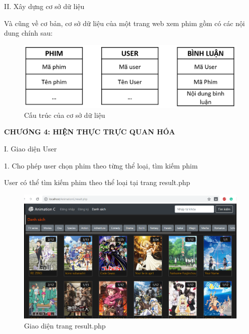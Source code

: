 \documentclass{report}
\begin{document}
\setlength{\parindent}{0cm}
\changefontsizes{14pt}
II. Xây dựng cơ sở dữ liệu

\setlength{\parindent}{1cm}
\changefontsizes{13pt}
Và cũng về cơ bản, cơ sở dữ liệu của một trang web xem phim gồm có các nội dung chính sau:

\begin{center}
    \begin{figure}[htp]
    \begin{center}
     \includegraphics[scale=0.45]{33.png}
    \end{center}
    \caption{Cấu trúc của cơ sở dữ liệu}
    \label{refhinh1}
    \end{figure}
\end{center}


\newpage
\changefontsizes{16pt}
\centerline{\textbf{CHƯƠNG 4: HIỆN THỰC TRỰC QUAN HÓA}}


\setlength{\parindent}{0cm}
\changefontsizes{14pt}
I. Giao diện User

1. Cho phép user chọn phim theo từng thể loại, tìm kiếm phim

\changefontsizes{13pt}
\setlength{\parindent}{1cm}
User có thể tìm kiếm phim theo thể loại tại trang result.php

\begin{center}
    \begin{figure}[htp]
    \begin{center}
     \includegraphics[scale=0.45]{1.png}
    \end{center}
    \caption{Giao diện trang result.php}
    \label{refhinh1}
    \end{figure}
\end{center}
\end{document}
